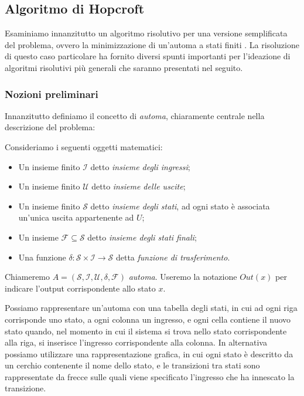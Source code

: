 \subsection{Algoritmo di Hopcroft}
Esaminiamo innanzitutto un algoritmo risolutivo per una versione semplificata del problema, ovvero la minimizzazione di un'automa a stati finiti \cite{hopcroft}. La risoluzione di questo caso particolare ha fornito diversi spunti importanti per l'ideazione di algoritmi risolutivi più generali che saranno presentati nel seguito.

\newcommand{\automata}{$\mathcal{A} = (\mathcal{S},\mathcal{I},\mathcal{U},\mathcal{F},\delta)$ }
\newcommand{\argsautomata}{$\mathcal{S},\mathcal{I},\mathcal{U},\mathcal{F},\delta$ }

\subsubsection{Nozioni preliminari}
Innanzitutto definiamo il concetto di \emph{automa}, chiaramente centrale nella descrizione del problema:
\begin{definition}
    Consideriamo i seguenti oggetti matematici:
    \begin{itemize}
        \item Un insieme finito $\mathcal{I}$ detto \emph{insieme degli ingressi};
        \item Un insieme finito $\mathcal{U}$ detto \emph{insieme delle uscite};
        \item Un insieme finito $\mathcal{S}$ detto \emph{insieme degli stati}, ad ogni stato è associata un'unica uscita appartenente ad $U$;
        \item Un insieme $\mathcal{F} \subseteq \mathcal{S}$ detto \emph{insieme degli stati finali};
        \item Una funzione $\delta: \mathcal{S} \times \mathcal{I} \to \mathcal{S}$ detta \emph{funzione di trasferimento}.
    \end{itemize}
    Chiameremo $A = (\mathcal{S},\mathcal{I},\mathcal{U},\delta,\mathcal{F})$ \emph{automa}. Useremo la notazione $Out(x)$ per indicare l'output corrispondente allo stato $x$.
\end{definition}
Possiamo rappresentare un'automa con una tabella degli stati, in cui ad ogni riga corrisponde uno stato, a ogni colonna un ingresso, e ogni cella contiene il nuovo stato quando, nel momento in cui il sistema si trova nello stato corrispondente alla riga, si inserisce l'ingresso corrispondente alla colonna. In alternativa possiamo utilizzare una rappresentazione grafica, in cui ogni stato è descritto da un cerchio contenente il nome dello stato, e le transizioni tra stati sono rappresentate da frecce sulle quali viene specificato l'ingresso che ha innescato la transizione.

